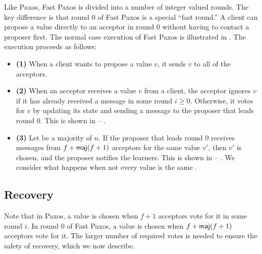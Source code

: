 Like Paxos, Fast Paxos is divided into a number of integer valued rounds.  The
key difference is that round 0 of Fast Paxos is a special ``fast round.'' A
client can propose a value directly to an acceptor in round 0 without having to
contact a proposer first. The normal case execution of Fast Paxos is
illustrated in . The execution proceeds as follows:

\begin{itemize}
  \item \textbf{(1)}
    When a client wants to propose a value $v$, it sends $v$ to all of the
    acceptors.

  \item \textbf{(2)}
    When an acceptor receives a value $v$ from a client, the acceptor ignores
    $v$ if it has already received a message in some round $i \geq 0$.
    Otherwise, it votes for $v$ by updating its state and sending a
     message to the proposer that leads round $0$. This is
    shown in   --
    .

  \item \textbf{(3)}
    Let  be a majority of $n$.
    If the proposer that leads round $0$ receives  messages
    from $f + \textsf{maj}(f+1)$ acceptors for the same value $v'$, then $v'$ is
    chosen, and the proposer notifies the learners. This is shown in
      -- . We
    consider what happens when not every value is the same .
\end{itemize}

%
\subsection{Recovery}
Note that in Paxos, a value is chosen when $f+1$ acceptors vote for it in some
round $i$. In round $0$ of Fast Paxos, a value is chosen when $f + \textsf{maj}(f+1)$
acceptors vote for it. The larger number of required votes is needed to ensure
the safety of recovery, which we now describe.

